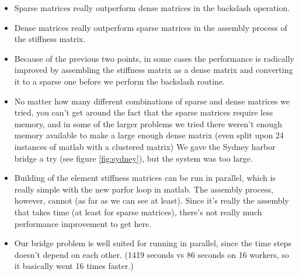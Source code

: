 \begin{itemize}
\item Sparse matrices really outperform dense matrices in the backslash operation.
\item Dense matrices really outperform sparse matrices in the assembly process of the stiffness matrix.
\item Because of the previous two points, in some cases the performance is radically improved by assembling the stiffness matrix as a dense matrix and converting it to a sparse one before we perform the backslash routine.
\item No matter how many different combinations of sparse and dense matrices we tried, you can't get around the fact that the sparse matrices require less memory, and in some of the larger problems we tried there weren't enough memory available to make a large enough dense matrix (even split upon 24 instances of matlab with a clustered matrix) We gave the Sydney harbor bridge a try (see figure \ref{fig:sydney}), but the system was too large.
\item Building of the element stiffness matrices can be run in parallel, which is really simple with the new parfor loop in matlab. The assembly process, however, cannot (as far as we can see at least). Since it's really the assembly that takes time (at least for sparse matrices), there's not really much performance improvement to get here.
\item Our bridge problem is well suited for running in parallel, since the time steps doesn’t depend on each other. (1419 seconds vs 86 seconds on 16 workers, so it basically went 16 times faster.)
\end{itemize}
